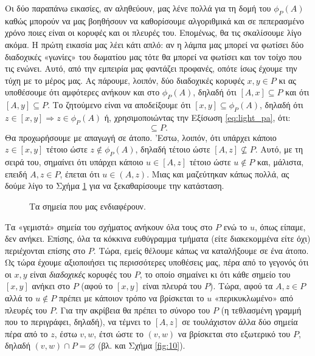 \documentclass[11pt,a4paper]{article}
\theoremstyle{definition}
\begin{document}
	Οι δύο παραπάνω εικασίες, αν αληθεύουν, μας λένε πολλά για τη δομή του $\phi_P(A)$ καθώς μπορούν να μας βοηθήσουν να καθορίσουμε αλγοριθμικά και σε πεπερασμένο χρόνο ποιες είναι οι κορυφές και οι πλευρές του. Επομένως, θα τις σκαλίσουμε λίγο ακόμα. Η πρώτη εικασία μας λέει κάτι απλό: αν η λάμπα μας μπορεί να φωτίσει δύο διαδοχικές «γωνίες» του δωματίου μας τότε θα μπορεί να φωτίσει και τον τοίχο που τις ενώνει. Αυτό, από την εμπειρία μας φαντάζει προφανές, οπότε ίσως έχουμε την τύχη με το μέρος μας. Ας πάρουμε, λοιπόν, δύο διαδοχικές κορυφές $x,y\in P$ κι ας υποθέσουμε ότι αμφότερες ανήκουν και στο $\phi_P(A)$, δηλαδή ότι $[A,x]\subseteq P$ και ότι $[A,y]\subseteq P$. Το ζητούμενο είναι να αποδείξουμε ότι $[x,y]\subseteq\phi_P(A)$, δηλαδή ότι $z\in[x,y]\Rightarrow z\in\phi_P(A)$ ή, χρησιμοποιώντας την Εξίσωση \eqref{eq:light_pa}, ότι:
	\begin{equation}
	[A,z]\subseteq P.
	\end{equation}
	Θα προχωρήσουμε με απαγωγή σε άτοπο. 'Εστω, λοιπόν, ότι υπάρχει κάποιο $z\in[x,y]$ τέτοιο ώστε $z\not\in\phi_P(A)$, δηλαδή τέτοιο ώστε $[A,z]\not\subseteq P$. Αυτό, με τη σειρά του, σημαίνει ότι υπάρχει κάποιο $u\in[A,z]$ τέτοιο ώστε $u\not\in P$ και, μάλιστα, επειδή $A,z\in P$, έπεται ότι $u\in(A,z)$. Μιας και μαζεύτηκαν κάπως πολλά, ας δούμε λίγο το Σχήμα \ref{fig:9} για να ξεκαθαρίσουμε την κατάσταση.
	
	\begin{figure}[!htb]
		\centering
		\caption{Τα σημεία που μας ενδιαφέρουν.}
		\label{fig:9}
	\end{figure}

	Τα «γεμιστά» σημεία του σχήματος ανήκουν όλα τους στο $P$ ενώ το $u$, όπως είπαμε, δεν ανήκει. Επίσης, όλα τα κόκκινα ευθύγραμμα τμήματα (είτε διακεκομμένα είτε όχι) περιέχονται επίσης στο $P$. Τώρα, εμείς θέλουμε κάπως να καταλήξουμε σε ένα άτοπο. Ως τώρα έχουμε αξιοποιήσει τις περισσότερες υποθέσεις μας, πέρα από το γεγονός ότι οι $x,y$ είναι \textit{διαδοχικές} κορυφές του $P$, το οποίο σημαίνει κι ότι κάθε σημείο του $[x,y]$ ανήκει στο $P$ (αφού το $[x,y]$ είναι πλευρά του $P$). Τώρα, αφού τα $A,z\in P$ αλλά το $u\not\in P$ πρέπει με κάποιον τρόπο να βρίσκεται το $u$ «περικυκλωμένο» από πλευρές του $P$. Για την ακρίβεια θα πρέπει το σύνορο του $P$ (η τεθλασμένη γραμμή που το περιγράφει, δηλαδή), να τέμνει το $[A,z]$ σε τουλάχιστον άλλα δύο σημεία πέρα από το $z$, έστω $v,w$, έτσι ώστε το $(v,w)$ να βρίσκεται στο εξωτερικό του $P$, δηλαδή $(v,w)\cap P=\varnothing$ (βλ. και Σχήμα \ref{fig:10}).
	
\end{document}
